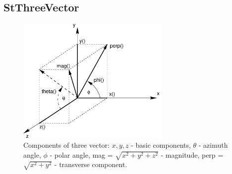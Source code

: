 \documentclass[twoside]{article}
\begin{document}
%
%
\subsection{StThreeVector } \label{StThreeVector}
\begin{figure}[bh]
    \begin{center}
        \includegraphics[width=0.65\textwidth]{vec3.eps}
        \caption{Components of three vector: $x,y,z$ - basic components,
            $\theta$ - azimuth angle, $\phi$ - polar angle, mag =
            $\sqrt{x^2+y^2+z^2}$ - magnitude, perp = $\sqrt{x^2+y^2}$
            - transverse component.}
        \label{fig:StThreeVector}
    \end{center}    
\end{figure}
\end{document}
